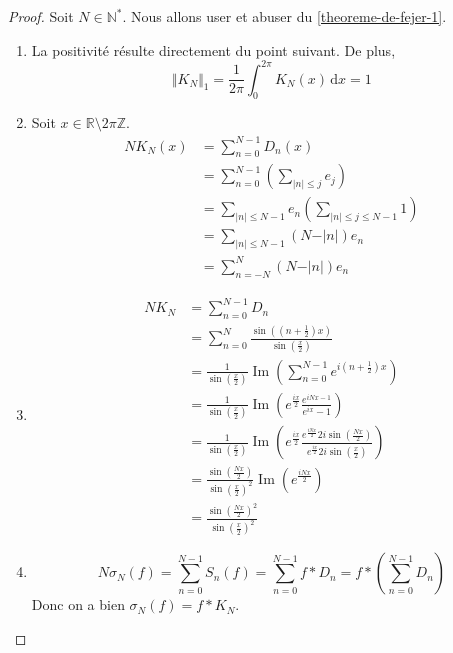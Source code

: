   \begin{proof}
    Soit $N\in\mathbb{N}^*$. Nous allons user et abuser du \cref{theoreme-de-fejer-1}.
    \begin{enumerate}[label=(\roman*)]
      \item La positivité résulte directement du point suivant. De plus,
      \[ \Vert K_N \Vert_1 = \frac{1}{2\pi} \int_0^{2\pi} K_N(x) \, \mathrm{d}x = 1 \]
      \item Soit $x\in\mathbb{R}\setminus 2\pi\mathbb{Z}$.
      \begin{align*}
        NK_N(x)&=\sum_{n=0}^{N-1} D_n(x) \\
        &= \sum_{n=0}^{N-1} \left( \sum_{\vert n \vert \leq j} e_j \right) \\
        &= \sum_{\vert n \vert \leq N-1} e_n \left( \sum_{\vert n \vert \leq j \leq N-1} 1 \right) \\
        &= \sum_{\vert n \vert \leq N-1} (N - \vert n \vert) e_n \\
        &= \sum_{n=-N}^{N} (N - \vert n \vert) e_n
      \end{align*}
      \item \begin{align*}
        NK_N&=\sum_{n=0}^{N-1}{D_n} \\
        &=\sum_{n=0}^{N}{\frac{\sin \left( \left( n + \frac{1}{2} \right) x \right)}{\sin \left ( \frac{x}{2} \right)}} \\
        &=\frac{1}{\sin \left ( \frac{x}{2} \right)}\operatorname{Im} \left( \sum_{n=0}^{N-1}{e^{i(n+\frac{1}{2})x}} \right) \\
        &=\frac{1}{\sin \left ( \frac{x}{2} \right)}\operatorname{Im} \left ( e^{\frac{ix}{2}}\frac{e^{iNx-1}}{e^{ix}-1} \right) \\
        &=\frac{1}{\sin \left ( \frac{x}{2} \right)} \operatorname{Im} \left ( e^{\frac{ix}{2}}\frac{e^{\frac{iNx}{2}}2i\sin \left( \frac{Nx}{2} \right)}{e^{\frac{ix}{2}}2i \sin \left ( \frac{x}{2} \right)} \right ) \\
        &=\frac{\sin \left( \frac{Nx}{2} \right)}{\sin \left ( \frac{x}{2} \right)^2}\operatorname{Im} \left(e^{\frac{iNx}{2}} \right) \\
        &=\frac{\sin \left( \frac{Nx}{2} \right)^2}{\sin \left ( \frac{x}{2} \right)^2}
      \end{align*}
      \item \[ N \sigma_N(f) = \sum_{n=0}^{N-1} S_n(f) = \sum_{n=0}^{N-1} f * D_n = f * \left (\sum_{n=0}^{N-1} D_n \right) \]
      Donc on a bien $\sigma_N(f) = f * K_N$.
    \end{enumerate}
  \end{proof}

